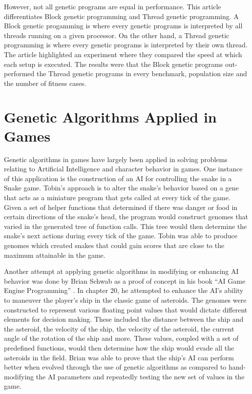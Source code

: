 However, not all genetic programs are equal in performance.  This article  differentiates Block genetic programming and Thread genetic programming\cite{Robbilliard09}.  A Block genetic progamming is where every genetic programs is
interpreted by all threads running on a given processor.  On the other hand, a Thread genetic programming is where every genetic programs is interpreted by their own thread.  The article 
highlighted an experiment where they compared the speed at which each setup is executed.  The results were that the Block genetic programs out-performed the Thread genetic programs in every benchmark, 
population size and the number of fitness cases.

\section{Genetic Algorithms Applied in Games}

Genetic algorithms in games have largely been applied in solving problems relating to Artificial Intelligence and character behavior in games. One instance of this application 
is the construction of an AI for controlling the snake in a Snake game\cite{Ehlis00}. Tobin's approach is to alter the snake's behavior based on a gene that acts as a miniature 
program that gets called at every tick of the game. Given a set of helper functions that determined if there was danger or food in certain directions of the snake's head, the program 
would construct genomes that varied in the generated tree of function calls. This tree would then determine the snake's next actions during every tick of the game. Tobin was able to 
produce genomes which created snakes that could gain scores that are close to the maximum attainable in the game.  

Another attempt at applying genetic algorithms in modifying or 
enhancing AI behavior was done by Brian Schwab as a proof of concept in his book “AI Game Engine Programming” \cite{Schwab04}. In chapter 20, he attempted to enhance the AI's ability to maneuver 
the player's ship in the classic game of asteroids. The genomes were constructed to represent various floating point values that would dictate different elements for decision making. 
These included the distance between the ship and the asteroid, the velocity of the ship, the velocity of the asteroid, the current angle of the rotation of the ship and more. 
These values, coupled with a set of predefined functions, would then determine how the ship would evade all the asteroids in the field. Brian was able to prove that the ship's AI can 
perform better when evolved through the use of genetic algorithms as compared to hand-modifying the AI parameters and repeatedly testing the new set of values in the game.

